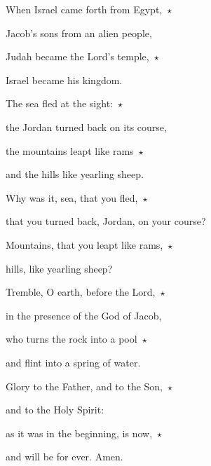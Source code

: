\noindent When Israel came forth from Egypt,~$\star$~\nopagebreak

Jacob’s sons from an alien people,

\noindent Judah became the Lord’s temple,~$\star$~\nopagebreak

Israel became his kingdom.

\noindent The sea fled at the sight:~$\star$~\nopagebreak

the Jordan turned back on its course,

\noindent the mountains leapt like rams~$\star$~\nopagebreak

and the hills like yearling sheep.

\noindent Why was it, sea, that you fled,~$\star$~\nopagebreak

that you turned back, Jordan, on your course?

\noindent Mountains, that you leapt like rams,~$\star$~\nopagebreak

hills, like yearling sheep?

\noindent Tremble, O earth, before the Lord,~$\star$~\nopagebreak

in the presence of the God of Jacob,

\noindent who turns the rock into a pool~$\star$~\nopagebreak

and flint into a spring of water.

\noindent Glory to the Father, and to the Son,~$\star$~\nopagebreak

and to the Holy Spirit:

\noindent as it was in the beginning, is now,~$\star$~\nopagebreak

and will be for ever. Amen.
